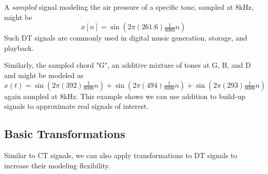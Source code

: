 \begin{example}
  A \emph{sampled} signal modeling the air pressure of a specific tone, sampled at 8kHz, might be 
  \[
  x[n] = \sin\left(2\pi (261.6) \tfrac{1}{8000} n\right)
  \]
  Such DT signals are commonly used in digital music generation, storage, and playback.
\end{example}
\begin{example}
    Similarly, the sampled chord "G", an additive mixture of tones at G, B, and D and might be modeled as
    \[
    x(t) = \sin\left(2\pi (392) \tfrac{1}{8000} n\right) + \sin\left(2\pi (494) \tfrac{1}{8000} n\right) + \sin\left(2\pi (293) \tfrac{1}{8000} n\right) 
    \]
    again sampled at 8kHz. This example shows we can use addition to build-up signals to approximate real signals of interest.
\end{example}

\subsection{Basic Transformations}

Similar to CT signals, we can also apply transformations to DT signals to increase their modeling flexibility.

